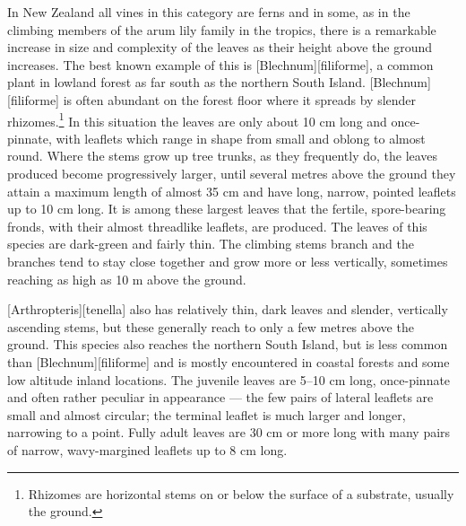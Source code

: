 In New Zealand all vines in this category are ferns and in some, as in the climbing members of the arum lily family in the tropics, there is a remarkable increase in size and complexity of the leaves as their height above the ground increases.
The best known example of this is [Blechnum][filiforme], a common plant in lowland forest as far south as the northern South Island. [Blechnum][filiforme] is often abundant on the forest floor where it spreads by slender rhizomes.\footnote{Rhizomes are horizontal stems on or below the surface of a substrate, usually the ground.}
In this situation the leaves are only about 10 cm long and once-pinnate, with leaflets which range in shape from small and oblong to almost round.
Where the stems grow up tree trunks, as they frequently do, the leaves produced become progressively larger, until several metres above the ground they attain a maximum length of almost 35 cm and have long, narrow, pointed leaflets up to 10 cm long.
It is among these largest leaves that the fertile, spore-bearing fronds, with their almost threadlike leaflets, are produced.
The leaves of this species are dark-green and fairly thin.
The climbing stems branch and the branches tend to stay close together and grow more or less vertically, sometimes reaching as high as 10 m above the ground.

[Arthropteris][tenella] also has relatively thin, dark leaves and slender, vertically ascending stems, but these generally reach to only a few metres above the ground.
This species also reaches the northern South Island, but is less common than [Blechnum][filiforme] and is mostly encountered in coastal forests and some low altitude inland locations.
The juvenile leaves are 5--10 cm long, once-pinnate and often rather peculiar in appearance --- the few pairs of lateral leaflets are small and almost circular; the terminal leaflet is much larger and longer, narrowing to a point.
Fully adult leaves are 30 cm or more long with many pairs of narrow, wavy-margined leaflets up to 8 cm long.

